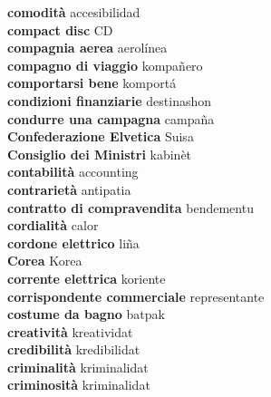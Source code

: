 \textbf{ comodità  } accesibilidad \\
\textbf{ compact disc  } CD \\
\textbf{ compagnia aerea  } aerolínea \\
\textbf{ compagno di viaggio  } kompañero \\
\textbf{ comportarsi bene  } komportá \\
\textbf{ condizioni finanziarie  } destinashon \\
\textbf{ condurre una campagna  } campaña \\
\textbf{ Confederazione Elvetica  } Suisa \\
\textbf{ Consiglio dei Ministri  } kabinèt \\
\textbf{ contabilità  } accounting \\
\textbf{ contrarietà  } antipatia \\
\textbf{ contratto di compravendita  } bendementu \\
\textbf{ cordialità  } calor \\
\textbf{ cordone elettrico  } liña \\
\textbf{ Corea  } Korea \\
\textbf{ corrente elettrica  } koriente \\
\textbf{ corrispondente commerciale  } representante \\
\textbf{ costume da bagno  } batpak \\
\textbf{ creatività  } kreatividat \\
\textbf{ credibilità  } kredibilidat \\
\textbf{ criminalità  } kriminalidat \\
\textbf{ criminosità  } kriminalidat \\
